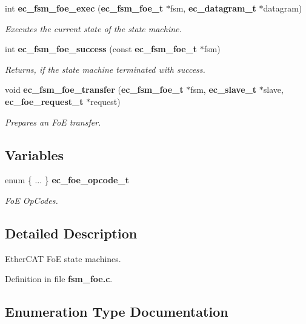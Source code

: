 \begin{DoxyCompactItemize}
int {\bf ec\-\_\-fsm\-\_\-foe\-\_\-exec} ({\bf ec\-\_\-fsm\-\_\-foe\-\_\-t} $\ast$fsm, {\bf ec\-\_\-datagram\-\_\-t} $\ast$datagram)
\begin{DoxyCompactList}\small\item\em \-Executes the current state of the state machine. \end{DoxyCompactList}\item 
int {\bf ec\-\_\-fsm\-\_\-foe\-\_\-success} (const {\bf ec\-\_\-fsm\-\_\-foe\-\_\-t} $\ast$fsm)
\begin{DoxyCompactList}\small\item\em \-Returns, if the state machine terminated with success. \end{DoxyCompactList}\item 
void {\bf ec\-\_\-fsm\-\_\-foe\-\_\-transfer} ({\bf ec\-\_\-fsm\-\_\-foe\-\_\-t} $\ast$fsm, {\bf ec\-\_\-slave\-\_\-t} $\ast$slave, {\bf ec\-\_\-foe\-\_\-request\-\_\-t} $\ast$request)
\begin{DoxyCompactList}\small\item\em \-Prepares an \-Fo\-E transfer. \end{DoxyCompactList}\end{DoxyCompactItemize}
\subsection*{\-Variables}
\begin{DoxyCompactItemize}
\item 
enum  \{ ... \}  {\bf ec\-\_\-foe\-\_\-opcode\-\_\-t}\label{fsm__foe_8c_ae1522d53c9b6fc891d7fc2e95440da60}

\begin{DoxyCompactList}\small\item\em \-Fo\-E \-Op\-Codes. \end{DoxyCompactList}\end{DoxyCompactItemize}


\subsection{\-Detailed \-Description}
\-Ether\-C\-A\-T \-Fo\-E state machines. 

\-Definition in file {\bf fsm\-\_\-foe.\-c}.



\subsection{\-Enumeration \-Type \-Documentation}
